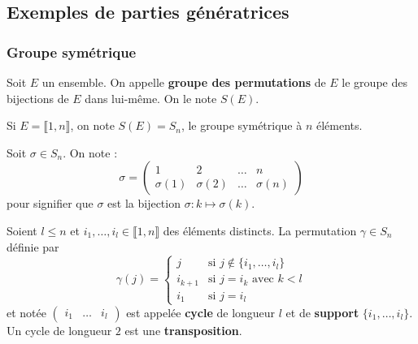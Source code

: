  \subsection{Exemples de parties génératrices}

  \subsubsection{Groupe symétrique}


  \begin{definition}
    Soit $E$ un ensemble. On appelle \textbf{groupe des permutations} de $E$ le groupe des bijections de $E$ dans lui-même. On le note $S(E)$.
  \end{definition}

  \begin{notation}
    Si $E = \llbracket 1, n \rrbracket$, on note $S(E) = S_n$, le groupe symétrique à $n$ éléments.
  \end{notation}

  \begin{notation}
    Soit $\sigma \in S_n$. On note :
    \[
    \sigma =
    \begin{pmatrix}
      1 & 2 & \dots & n \\
      \sigma(1) & \sigma(2) & \dots & \sigma(n)
    \end{pmatrix}
    \]
    pour signifier que $\sigma$ est la bijection $\sigma : k \mapsto \sigma(k)$.
  \end{notation}

  \begin{definition}
    Soient $l \leq n$ et $i_1, \dots, i_l \in \llbracket 1, n \rrbracket$ des éléments distincts. La permutation $\gamma \in S_n$ définie par
    \[
    \gamma(j) =
    \begin{cases}
      j &\text{si } j \notin \{ i_1, \dots, i_l \} \\
      i_{k+1} &\text{si } j = i_k \text{ avec } k<l \\
      i_1 &\text{si } j=i_l
    \end{cases}
    \]
    et notée $\begin{pmatrix} i_1 & \dots & i_l \end{pmatrix}$ est appelée \textbf{cycle} de longueur $l$ et de \textbf{support} $\{ i_1, \dots, i_l \}$. Un cycle de longueur $2$ est une \textbf{transposition}.
  \end{definition}

